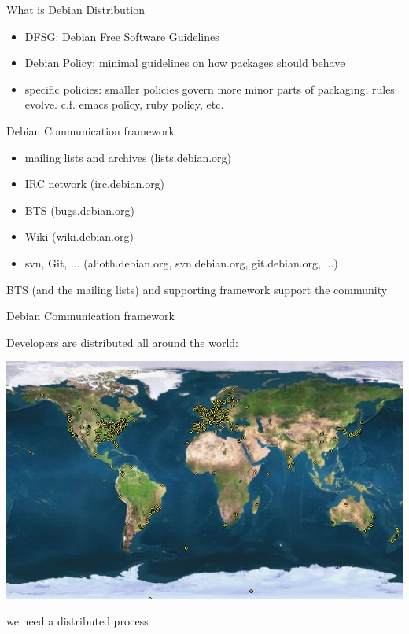\documentclass[cjk,dvipdfm,12pt]{beamer}
\begin{document}
\begin{frame}{What is Debian Distribution}
\begin{itemize}
 \item DFSG: Debian Free Software Guidelines
 \item Debian Policy: minimal guidelines on how packages should behave
 \item specific policies: smaller policies govern more minor parts of
       packaging; rules evolve. c.f. emacs policy, ruby policy, etc.
\end{itemize}
\end{frame}

\begin{frame}{Debian Communication framework}
 \begin{itemize}
  \item mailing lists and archives (lists.debian.org)
  \item IRC network (irc.debian.org)
  \item BTS (bugs.debian.org)
  \item Wiki (wiki.debian.org)
  \item svn, Git, ... (alioth.debian.org, svn.debian.org,
	git.debian.org, ...)
 \end{itemize}

BTS (and the mailing lists) and supporting framework support the community

\end{frame}

\begin{frame}{Debian Communication framework }

Developers are distributed all around the world:

 \includegraphics[width=1\hsize]{image200805/developers-map.jpeg} 

we need a distributed process

\end{frame}
\end{document}
